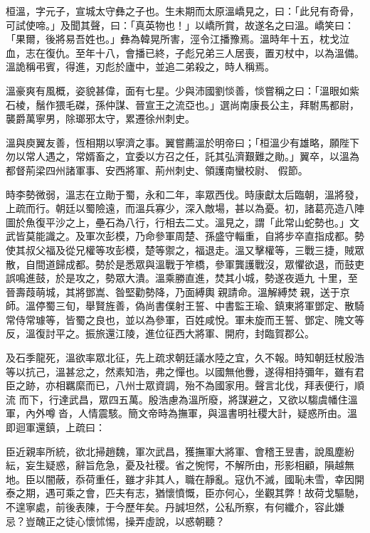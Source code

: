 \begin{pinyinscope}
 桓溫，字元子，宣城太守彝之子也。生未期而太原溫嶠見之，曰：「此兒有奇骨，可試使啼。」及聞其聲，曰：「真英物也！」以嶠所賞，故遂名之曰溫。嶠笑曰：「果爾，後將易吾姓也。」彝為韓晃所害，涇令江播豫焉。溫時年十五，枕戈泣
 血，志在復仇。至年十八，會播已終，子彪兄弟三人居喪，置刃杖中，以為溫備。溫詭稱弔賓，得進，刃彪於廬中，並追二弟殺之，時人稱焉。



 溫豪爽有風概，姿貌甚偉，面有七星。少與沛國劉惔善，惔嘗稱之曰：「溫眼如紫石棱，鬚作猥毛磔，孫仲謀、晉宣王之流亞也。」選尚南康長公主，拜駙馬都尉，襲爵萬寧男，除瑯邪太守，累遷徐州刺史。



 溫與庾翼友善，恆相期以寧濟之事。翼嘗薦溫於明帝曰；「桓溫少有雄略，願陛下勿以常人遇之，常婿畜之，宜委以方召之任，託其弘濟艱難之勛。」翼卒，以溫為都督荊梁四州諸軍事、安西將軍、荊州刺史、領護南蠻校尉、
 假節。



 時李勢微弱，溫志在立勛于蜀，永和二年，率眾西伐。時康獻太后臨朝，溫將發，上疏而行。朝廷以蜀險遠，而溫兵寡少，深入敵場，甚以為憂。初，諸葛亮造八陣圖於魚復平沙之上，壘石為八行，行相去二丈。溫見之，謂「此常山蛇勢也。」文武皆莫能識之。及軍次彭模，乃命參軍周楚、孫盛守輜重，自將步卒直指成都。勢使其叔父福及從兄權等攻彭模，楚等禦之，福退走。溫又擊權等，三戰三捷，賊眾散，自間道歸成都。勢於是悉眾與溫戰于笮橋，參軍龔護戰沒，眾懼欲退，而鼓吏誤鳴進鼓，於是攻之，勢眾大潰。溫乘勝直進，焚其小城，勢遂夜遁九
 十里，至晉壽葭萌城，其將鄧嵩、昝堅勸勢降，乃面縛輿親請命。溫解縛焚親，送于京師。溫停蜀三旬，舉賢旌善，偽尚書僕射王誓、中書監王瑜、鎮東將軍鄧定、散騎常侍常璩等，皆蜀之良也，並以為參軍，百姓咸悅。軍未旋而王誓、鄧定、隗文等反，溫復討平之。振旅還江陵，進位征西大將軍、開府，封臨賀郡公。



 及石季龍死，溫欲率眾北征，先上疏求朝廷議水陸之宜，久不報。時知朝廷杖殷浩等以抗己，溫甚忿之，然素知浩，弗之憚也。以國無他釁，遂得相持彌年，雖有君臣之跡，亦相羈縻而已，八州士眾資調，殆不為國家用。聲言北伐，拜表便行，順流
 而下，行達武昌，眾四五萬。殷浩慮為溫所廢，將謀避之，又欲以騶虞幡住溫軍，內外噂沓，人情震駭。簡文帝時為撫軍，與溫書明社稷大計，疑惑所由。溫即迴軍還鎮，上疏曰：



 臣近親率所統，欲北掃趙魏，軍次武昌，獲撫軍大將軍、會稽王昱書，說風塵紛紜，妄生疑惑，辭旨危急，憂及社稷。省之惋愕，不解所由，形影相顧，隕越無地。臣以闇蔽，忝荷重任，雖才非其人，職在靜亂。寇仇不滅，國恥未雪，幸因開泰之期，遇可乘之會，匹夫有志，猶懷憤慨，臣亦何心，坐觀其弊！故荷戈驅馳，不遑寧處，前後表陳，于今歷年矣。丹誠坦然，公私所察，有何纖介，容此嫌
 忌？豈醜正之徒心懷怵惕，操弄虛說，以惑朝聽？




\end{pinyinscope}
